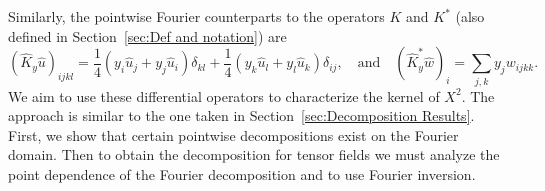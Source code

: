 \documentclass[11pt]{article}
\newcommand{\Rb}{\mathbb{R}}
\begin{document}
Similarly, the pointwise Fourier counterparts to the operators $K$ and $K^*$ (also defined in Section~\ref{sec:Def and notation}) are
\begin{equation}
(\widehat{K}_y\widehat{u})_{ijkl}
=
\frac{1}{4}
(y_i\widehat u_j + y_j\widehat u_i)
\delta_{kl}
+
\frac{1}{4}
(y_k\widehat u_l + y_l\widehat u_k)
\delta_{ij},
\quad\text{and}\quad
(\widehat{K}^*_y\widehat w)_i
=
\sum_{j,k}
y_jw_{ijkk}.
\end{equation}
We aim to use these differential operators to characterize the kernel of $X^2$. The approach is similar to the one taken in Section~\ref{sec:Decomposition Results}. First, we show that certain pointwise decompositions exist on the Fourier domain. Then to obtain the decomposition for tensor fields we must analyze the point dependence of the Fourier decomposition and to use Fourier inversion. 
\end{document}
